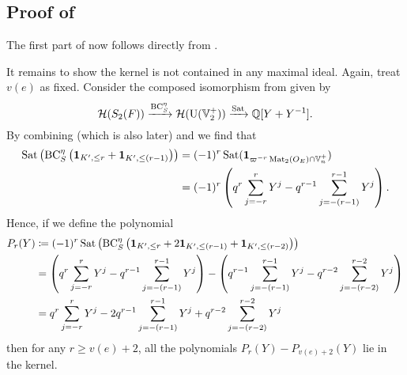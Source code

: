 \subsection{Proof of }
The first part of  now follows directly from
.

It remains to show the kernel is not contained in any maximal ideal.
Again, treat $v(e)$ as fixed.
Consider the composed isomorphism from 
given by
\[ \mathcal H(S_2(F)) \xrightarrow{\operatorname{BC}^\eta_S} \mathcal H(\operatorname{U}(\mathbb V_2^+)) \xrightarrow{\operatorname{Sat}} \mathbb Q[Y + Y^{-1}]. \]
By combining \cite[Equation (7.1.9)]{ref:AFLspherical}
(which is also  later)
and \cite[Equation (7.1.4)]{ref:AFLspherical}
we find that
\begin{align*}
  \operatorname{Sat}\left(\operatorname{BC}^\eta_S\left(\mathbf{1}_{K', \le r} + \mathbf{1}_{K', \le (r-1)}\right)\right)
  &= (-1)^r \operatorname{Sat}(\mathbf{1}_{\varpi^{-r} \operatorname{Mat}_2(O_E) \cap \mathbb V_n^+}) \\
  &= (-1)^r \left( q^r \sum_{j=-r}^r Y^j - q^{r-1} \sum_{j=-(r-1)}^{r-1} Y^j \right).
\end{align*}
Hence, if we define the polynomial
\begin{align*}
  P_r(Y) &\coloneqq (-1)^r \operatorname{Sat}\left(\operatorname{BC}^\eta_S\left(
    \mathbf{1}_{K', \le r} + 2\mathbf{1}_{K', \le (r-1)}
    + \mathbf{1}_{K', \le (r-2)} \right)\right) \\
  &= \left( q^r \sum_{j=-r}^r Y^j - q^{r-1} \sum_{j=-(r-1)}^{r-1} Y^j \right)
    - \left( q^{r-1} \sum_{j=-(r-1)}^{r-1} Y^j - q^{r-2} \sum_{j=-(r-2)}^{r-2} Y^j \right) \\
  &= q^r \sum_{j=-r}^r Y^j - 2q^{r-1} \sum_{j=-(r-1)}^{r-1} Y^j + q^{r-2} \sum_{j=-(r-2)}^{r-2} Y^j
\end{align*}
then for any $r \ge v(e)+2$,
all the polynomials $P_r(Y) - P_{v(e)+2}(Y)$ lie in the kernel.

